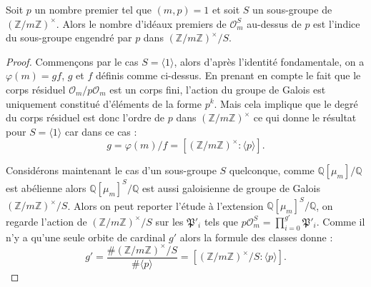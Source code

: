 \documentclass[a4paper]{article} %
\numberwithin{section}{part}
\numberwithin{equation}{section}
\newcommand\zmodninv[1]{(\mathbb{Z}/#1\mathbb{Z})^{\times}}
\newcommand\QQ{\mathbb{Q}}
\newcommand\EO{\mathcal{O}}
\newcommand\groupgen[1]{\langle{#1}\rangle}
\begin{document}
\begin{lem}
\label{lem:nbprimeabove}
Soit $p$ un nombre premier tel que $(m, p) = 1$ et soit $S$ un sous-groupe de
$\zmodninv{m}$. Alors le nombre d'idéaux premiers de $\EO_m^S$ au-dessus de $p$ 
est l'indice du sous-groupe engendré par $p$ dans $\zmodninv{m}/S$.
\end{lem}
\begin{proof}
Commençons par le cas $S = \groupgen{1}$, alors d'après l'identité fondamentale,
on a $\varphi(m) = gf$, $g$ et $f$ définis comme ci-dessus. En prenant en compte
le fait que le corps résiduel $\EO_m/p\EO_m$ est un corps fini, l'action du 
groupe de Galois est uniquement constitué d'éléments de la forme $p^k$.
Mais cela implique que le degré du corps résiduel est donc l'ordre de $p$ dans 
$\zmodninv{m}$ ce qui donne le résultat pour $S = \groupgen{1}$ car dans ce cas 
:
\begin{equation}
g = \varphi(m)/f = [\zmodninv{m}:\groupgen{p}].
\end{equation}

Considérons maintenant le cas d'un sous-groupe $S$ quelconque, comme 
$\QQ[\mu_m]/\QQ$ est abélienne alors $\QQ[\mu_m]^S/\QQ$ est aussi galoisienne 
de groupe de Galois $\zmodninv{m}/S$. Alors on peut reporter l'étude à 
l'extension $\QQ[\mu_m]^S/\QQ$, on regarde l'action de $\zmodninv{m}/S$ sur les
$\mathfrak{P}'_i$ tels que $p\EO_m^S = \prod_{i=0}^{g'}{\mathfrak{P}'_i}$. Comme
il n'y a qu'une seule orbite de cardinal $g'$ alors la formule des classes
donne :
\begin{equation}
g' = \frac{\#\zmodninv{m}/S}{\#\groupgen{p}} = 
[\zmodninv{m}/S:\groupgen{p}].
\end{equation}
\end{proof}
\end{document}
